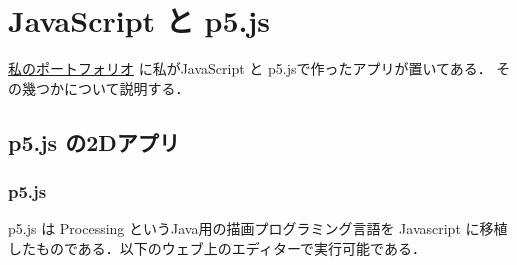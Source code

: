 %
%
%
%
%
%
%   
%

\chapter{JavaScript と p5.js}

\href{https://snow00two.github.io/mySite/}{私のポートフォリオ}
に私がJavaScript と p5.jsで作ったアプリが置いてある．
その幾つかについて説明する．

\section{ p5.js の2Dアプリ}
\subsection{p5.js}
p5.js は Processing というJava用の描画プログラミング言語を Javascript に移植したものである．以下のウェブ上のエディターで実行可能である．

